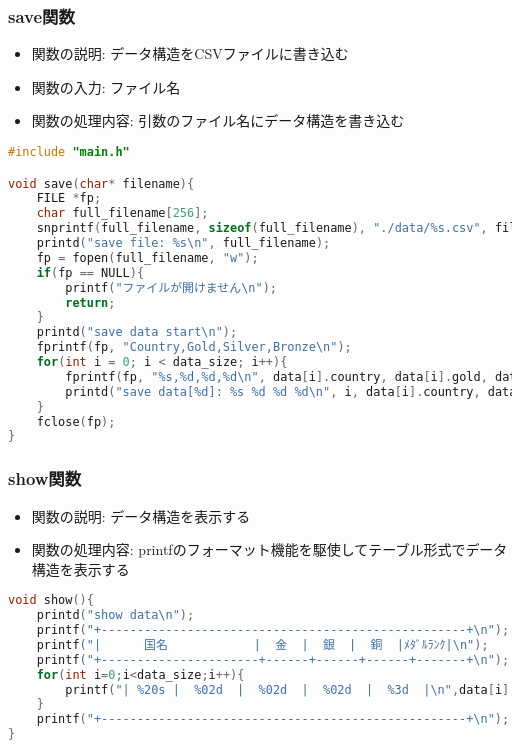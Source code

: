 \documentclass[a4paper,11pt]{jsarticle}
\begin{document}
\subsubsection*{save関数}
\begin{itemize}
    \item 関数の説明: データ構造をCSVファイルに書き込む
    \item 関数の入力: ファイル名
    \item 関数の処理内容: 引数のファイル名にデータ構造を書き込む
\end{itemize}
\begin{lstlisting}[caption=save関数のコード, label=save, language=C]
#include "main.h"

void save(char* filename){
    FILE *fp;
    char full_filename[256];
    snprintf(full_filename, sizeof(full_filename), "./data/%s.csv", filename);
    printd("save file: %s\n", full_filename);
    fp = fopen(full_filename, "w");
    if(fp == NULL){
        printf("ファイルが開けません\n");
        return;
    }
    printd("save data start\n");
    fprintf(fp, "Country,Gold,Silver,Bronze\n");
    for(int i = 0; i < data_size; i++){
        fprintf(fp, "%s,%d,%d,%d\n", data[i].country, data[i].gold, data[i].silver, data[i].bronze);
        printd("save data[%d]: %s %d %d %d\n", i, data[i].country, data[i].gold, data[i].silver, data[i].bronze);
    }
    fclose(fp);
}
\end{lstlisting}


\subsubsection*{show関数}
\begin{itemize}
    \item 関数の説明: データ構造を表示する
    \item 関数の処理内容: printfのフォーマット機能を駆使してテーブル形式でデータ構造を表示する
\end{itemize}
\begin{lstlisting}[caption=show関数のコード, label=show, language=C]
void show(){
    printd("show data\n");
    printf("+---------------------------------------------------+\n");
    printf("|      国名            |  金  |  銀  |  銅  |ﾒﾀﾞﾙﾗﾝｸ|\n");
    printf("+----------------------+------+------+------+-------+\n");
    for(int i=0;i<data_size;i++){
        printf("| %20s |  %02d  |  %02d  |  %02d  |  %3d  |\n",data[i].country,data[i].gold,data[i].silver,data[i].bronze,data[i].medal_rank);
    }
    printf("+---------------------------------------------------+\n");
}
\end{lstlisting}
\end{document}
